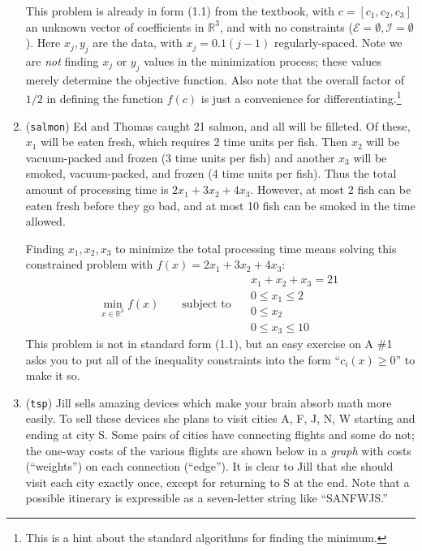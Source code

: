 \documentclass[11pt]{amsart}
\newcommand{\RR}{\mathbb{R}}
\begin{document}
\begin{enumerate}
This problem is already in form (1.1) from the textbook, with $c = \left[c_1,c_2,c_3\right]$ an unknown vector of coefficients in $\RR^3$, and with no constraints ($\mathcal{E}=\emptyset,\mathcal{I}=\emptyset$).  Here $x_j,y_j$ are the data, with $x_j = 0.1 (j-1)$ regularly-spaced.  Note we are \emph{not} finding $x_j$ or $y_j$ values in the minimization process; these values merely determine the objective function.  Also note that the overall factor of $1/2$ in defining the function $f(c)$ is just a convenience for differentiating.\footnote{This is a hint about the standard algorithms for finding the minimum.}

\medskip
\item (\texttt{salmon})  \quad Ed and Thomas caught 21 salmon, and all will be filleted.  Of these, $x_1$ will be eaten fresh, which requires 2 time units per fish.  Then $x_2$ will be vacuum-packed and frozen (3 time units per fish) and another $x_3$ will be smoked, vacuum-packed, and frozen (4 time units per fish).  Thus the total amount of processing time is $2 x_1 + 3 x_2 + 4 x_3$.  However, at most 2 fish can be eaten fresh before they go bad, and at most 10 fish can be smoked in the time allowed.

Finding $x_1,x_2,x_3$ to minimize the total processing time means solving this constrained problem with $f(x) = 2 x_1 + 3 x_2 + 4 x_3$:
	$$\min_{x\in\RR^3} f(x) \qquad \text{subject to }\quad \begin{matrix} x_1 + x_2 + x_3 = 21 \\ 0 \le x_1 \le 2 \\ 0 \le x_2 \\ 0 \le x_3 \le 10 \end{matrix}$$
This problem is not in standard form (1.1), but an easy exercise on A \#1 asks you to put all of the inequality constraints into the form ``$c_i(x) \ge 0$'' to make it so.

\medskip
\item (\texttt{tsp})  \quad Jill sells amazing devices which make your brain absorb math more easily.  To sell these devices she plans to visit cities A, F, J, N, W starting and ending at city S.  Some pairs of cities have connecting flights and some do not; the one-way costs of the various flights are shown below in a \emph{graph} with costs (``weights'') on each connection (``edge'').  It is clear to Jill that she should visit each city exactly once, except for returning to S at the end.  Note that a possible itinerary is expressible as a seven-letter string like ``SANFWJS.''


\end{enumerate}
\end{document}

